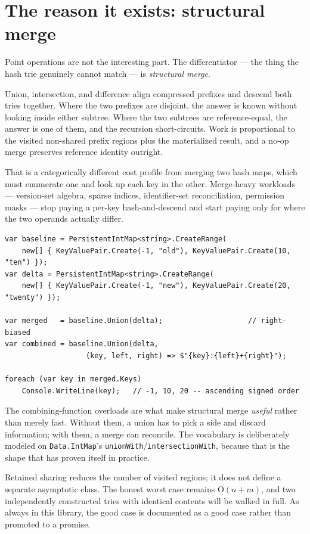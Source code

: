 \documentclass[11pt,twoside,openright]{book}
\newcommand{\code}[1]{\texorpdfstring{\textcolor{d7ink}{\texttt{#1}}}{#1}}
\newcommand{\term}[1]{\textit{#1}}
\newcommand{\bigoh}[1]{$\mathrm{O}(#1)$}
\begin{document}
\section{The reason it exists: structural merge}

Point operations are not the interesting part. The differentiator --- the thing
the hash trie genuinely cannot match --- is \term{structural merge}.

Union, intersection, and difference align compressed prefixes and descend both
tries together. Where the two prefixes are disjoint, the answer is known without
looking inside either subtree. Where the two subtrees are reference-equal, the
answer is one of them, and the recursion short-circuits. Work is proportional to
the visited non-shared prefix regions plus the materialized result, and a no-op
merge preserves reference identity outright.

That is a categorically different cost profile from merging two hash maps, which
must enumerate one and look up each key in the other. Merge-heavy workloads ---
version-set algebra, sparse indices, identifier-set reconciliation, permission
masks --- stop paying a per-key hash-and-descend and start paying only for
where the two operands actually differ.

\begin{lstlisting}[language={[Sharp]C}]
var baseline = PersistentIntMap<string>.CreateRange(
    new[] { KeyValuePair.Create(-1, "old"), KeyValuePair.Create(10, "ten") });
var delta = PersistentIntMap<string>.CreateRange(
    new[] { KeyValuePair.Create(-1, "new"), KeyValuePair.Create(20, "twenty") });

var merged   = baseline.Union(delta);                    // right-biased
var combined = baseline.Union(delta,
                   (key, left, right) => $"{key}:{left}+{right}");

foreach (var key in merged.Keys)
    Console.WriteLine(key);   // -1, 10, 20 -- ascending signed order
\end{lstlisting}

The combining-function overloads are what make structural merge \emph{useful}
rather than merely fast. Without them, a union has to pick a side and discard
information; with them, a merge can reconcile. The vocabulary is deliberately
modeled on \code{Data.IntMap}'s \code{unionWith}/\code{intersectionWith},
because that is the shape that has proven itself in practice.

\begin{caveatbox}
Retained sharing reduces the number of visited regions; it does not define a
separate asymptotic class. The honest worst case remains \bigoh{n+m}, and two
independently constructed tries with identical contents will be walked in full.
As always in this library, the good case is documented as a good case rather
than promoted to a promise.
\end{caveatbox}
\end{document}
